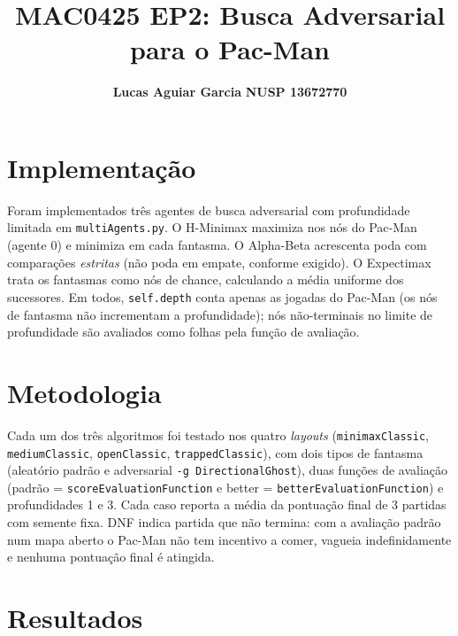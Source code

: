 \documentclass[11pt,a4paper]{article}
\title{\vspace{-1.2cm}MAC0425 EP2: Busca Adversarial para o Pac-Man}
\author{\textbf{Lucas Aguiar Garcia} \qquad \textbf{NUSP 13672770}}
\date{\vspace{-0.4cm}}
\begin{document}
\maketitle
\vspace{-0.6cm}

\section{Implementação}
Foram implementados três agentes de busca adversarial com profundidade limitada em
\texttt{multiAgents.py}. O H-Minimax maximiza nos nós do Pac-Man (agente 0) e minimiza em
cada fantasma. O Alpha-Beta acrescenta poda com comparações \emph{estritas} (não poda em
empate, conforme exigido). O Expectimax trata os fantasmas como nós de chance, calculando a
média uniforme dos sucessores. Em todos, \texttt{self.depth} conta apenas as jogadas do Pac-Man (os
nós de fantasma não incrementam a profundidade); nós não-terminais no limite de profundidade são
avaliados como folhas pela função de avaliação.

\section{Metodologia}
Cada um dos três algoritmos foi testado nos quatro \emph{layouts} (\texttt{minimaxClassic},
\texttt{mediumClassic}, \texttt{openClassic}, \texttt{trappedClassic}), com dois tipos de fantasma
(aleatório padrão e adversarial \texttt{-g DirectionalGhost}), duas funções de avaliação
(padrão = \texttt{scoreEvaluationFunction} e better = \texttt{betterEvaluationFunction})
e profundidades 1 e 3. Cada caso reporta a média da pontuação final de 3 partidas com semente
fixa. DNF indica partida que não termina: com a avaliação padrão num mapa aberto o Pac-Man não
tem incentivo a comer, vagueia indefinidamente e nenhuma pontuação final é atingida.

\section{Resultados}
\end{document}
